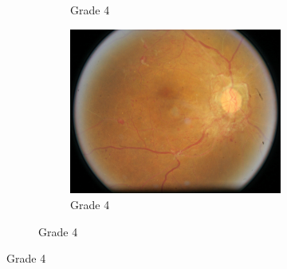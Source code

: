 \begin{figure}[tb]
\begin{subfigure}[b]{\textwidth}
\begin{subfigure}[b]{0.32\textwidth}
            \caption{Grade 4}
        \end{subfigure}
        \hfill
        \begin{subfigure}[b]{0.32\textwidth}
            \centering
            \includegraphics[width=\textwidth, height=0.2\textheight]{figures/chapter6/similar/3563_left.jpeg}
            \caption{Grade 4}
         \end{subfigure}
    \end{subfigure}
    \vspace{0.2em}
    

\end{figure}
